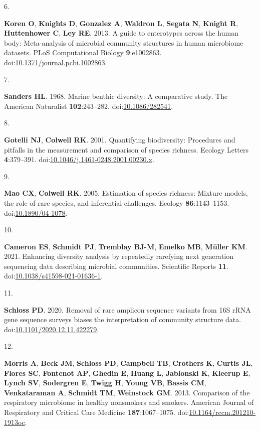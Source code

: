 \documentclass[
]{article}
\newlength{\cslhangindent}
\newlength{\csllabelwidth}
\newlength{\cslentryspacingunit} %
\newenvironment{CSLReferences}[2] %
 {%
  \setlength{\parindent}{0pt}
  \ifodd #1
  \let\oldpar\par
  \def\par{\hangindent=\cslhangindent\oldpar}
  \fi
  \setlength{\parskip}{#2\cslentryspacingunit}
 }%
 {}
\newcommand{\CSLLeftMargin}[1]{\parbox[t]{\csllabelwidth}{#1}}
\newcommand{\CSLRightInline}[1]{\parbox[t]{\linewidth - \csllabelwidth}{#1}\break}
\begin{document}
\begin{CSLReferences}{0}{1}
\leavevmode{}%
\CSLLeftMargin{6. }%
\CSLRightInline{\textbf{Koren O}, \textbf{Knights D}, \textbf{Gonzalez
A}, \textbf{Waldron L}, \textbf{Segata N}, \textbf{Knight R},
\textbf{Huttenhower C}, \textbf{Ley RE}. 2013. A guide to enterotypes
across the human body: Meta-analysis of microbial community structures
in human microbiome datasets. {PLoS} Computational Biology
\textbf{9}:e1002863.
doi:\href{https://doi.org/10.1371/journal.pcbi.1002863}{10.1371/journal.pcbi.1002863}.}

\leavevmode{}%
\CSLLeftMargin{7. }%
\CSLRightInline{\textbf{Sanders HL}. 1968. Marine benthic diversity: A
comparative study. The American Naturalist \textbf{102}:243--282.
doi:\href{https://doi.org/10.1086/282541}{10.1086/282541}.}

\leavevmode{}%
\CSLLeftMargin{8. }%
\CSLRightInline{\textbf{Gotelli NJ}, \textbf{Colwell RK}. 2001.
Quantifying biodiversity: Procedures and pitfalls in the measurement and
comparison of species richness. Ecology Letters \textbf{4}:379--391.
doi:\href{https://doi.org/10.1046/j.1461-0248.2001.00230.x}{10.1046/j.1461-0248.2001.00230.x}.}

\leavevmode{}%
\CSLLeftMargin{9. }%
\CSLRightInline{\textbf{Mao CX}, \textbf{Colwell RK}. 2005. Estimation
of species richness: Mixture models, the role of rare species, and
inferential challenges. Ecology \textbf{86}:1143--1153.
doi:\href{https://doi.org/10.1890/04-1078}{10.1890/04-1078}.}

\leavevmode{}%
\CSLLeftMargin{10. }%
\CSLRightInline{\textbf{Cameron ES}, \textbf{Schmidt PJ},
\textbf{Tremblay BJ-M}, \textbf{Emelko MB}, \textbf{Müller KM}. 2021.
Enhancing diversity analysis by repeatedly rarefying next generation
sequencing data describing microbial communities. Scientific Reports
\textbf{11}.
doi:\href{https://doi.org/10.1038/s41598-021-01636-1}{10.1038/s41598-021-01636-1}.}

\leavevmode{}%
\CSLLeftMargin{11. }%
\CSLRightInline{\textbf{Schloss PD}. 2020. Removal of rare amplicon
sequence variants from 16S {rRNA} gene sequence surveys biases the
interpretation of community structure data.
doi:\href{https://doi.org/10.1101/2020.12.11.422279}{10.1101/2020.12.11.422279}.}

\leavevmode{}%
\CSLLeftMargin{12. }%
\CSLRightInline{\textbf{Morris A}, \textbf{Beck JM}, \textbf{Schloss
PD}, \textbf{Campbell TB}, \textbf{Crothers K}, \textbf{Curtis JL},
\textbf{Flores SC}, \textbf{Fontenot AP}, \textbf{Ghedin E},
\textbf{Huang L}, \textbf{Jablonski K}, \textbf{Kleerup E},
\textbf{Lynch SV}, \textbf{Sodergren E}, \textbf{Twigg H}, \textbf{Young
VB}, \textbf{Bassis CM}, \textbf{Venkataraman A}, \textbf{Schmidt TM},
\textbf{Weinstock GM}. 2013. Comparison of the respiratory microbiome in
healthy nonsmokers and smokers. American Journal of Respiratory and
Critical Care Medicine \textbf{187}:1067--1075.
doi:\href{https://doi.org/10.1164/rccm.201210-1913oc}{10.1164/rccm.201210-1913oc}.}


\end{CSLReferences}
\end{document}
